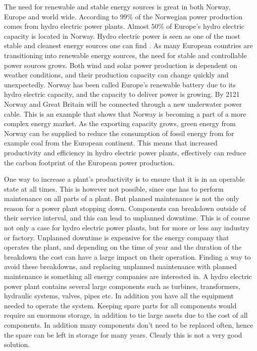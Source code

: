 The need for renewable and stable energy sources is great in both Norway, Europe and world wide. According to \cite{Statkraft2009} $99\%$ of the Norwegian power production comes from hydro electric power plants. Almost $50\%$ of Europe's hydro electric capacity is located in Norway. Hydro electric power is seen as one of the most stable and cleanest energy sources one can find \cite{Statkraft2009}. As many European countries are transitioning into renewable energy sources, the need for stable and controllable power sources grows. Both wind and solar power production is dependent on weather conditions, and their production capacity can change quickly and unexpectedly. Norway has been called Europe's renewable battery due to its hydro electric capacity, and the capacity to deliver power is growing. By 2121 Norway and Great Britain will be connected through a new underwater power cable. This is an example that shows that Norway is becoming a part of a more complex energy market. As the exporting capacity grows, green energy from Norway can be supplied to reduce the consumption of fossil energy from for example coal from the European continent. This means that increased productivity and efficiency in hydro electric power plants, effectively can reduce the carbon footprint of the European power production. 

One way to increase a plant's productivity is to ensure that it is in an operable state at all times. This is however not possible, since one has to perform maintenance on all parts of a plant. But planned maintenance is not the only reason for a power plant stopping down. Components can breakdown outside of their service interval, and this can lead to unplanned downtime. This is of course not only a case for hydro electric power plants, but for more or less any industry or factory. Unplanned downtime is expensive for the energy company that operates the plant, and depending on the time of year and the duration of the breakdown the cost can have a large impact on their operation. Finding a way to avoid these breakdowns, and replacing unplanned maintenance with planned maintenance is something all energy companies are interested in. A hydro electric power plant contains several large components such as turbines, transformers, hydraulic systems, valves, pipes etc. In addition you have all the equipment needed to operate the system. Keeping spare parts for all components would require an enormous storage, in addition to tie large assets due to the cost of all components. In addition many components don't need to be replaced often, hence the spare can be left in storage for many years. Clearly this is not a very good solution. 

